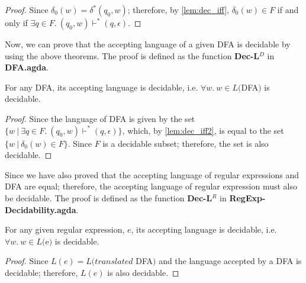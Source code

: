 \begin{proof}
\noindent Since \(\delta_0(w) = \delta^*(q_0,w)\); therefore, by
\autoref{lem:dec_iff}, \(\delta_0(w) \in F\) if and only if \(\exists
q\in F.\ (q_0,w) \vdash^* (q,\epsilon)\). 
\end{proof}

\par Now, we can prove that the accepting language of a given DFA is
decidable by using the above theorems. The proof is
defined as the function \textbf{Dec-L\(^D\)} in \textbf{DFA.agda}. 

\begin{thm}
\noindent For any DFA, its accepting language is decidable,
i.e. \(\forall w.\ w \in L(\)DFA\()\) is decidable. 
\end{thm}

\begin{proof}
\noindent Since the language of DFA is given by the set \(\{w\ |\
\exists q\in F.\ (q_0,w) \vdash^* (q,\epsilon)\}\), which, by
\autoref{lem:dec_iff2}, is equal to the set \(\{w\ |\ \delta_0(w) \in
F\}\). Since \(F\) is a decidable subset; therefore, the set is also
decidable. 
\end{proof}

\par Since we have also proved that the accepting language of regular
expressions and DFA are equal; therefore, the accepting language of
regular expression must also be decidable. The proof is defined as the
function \textbf{Dec-L\(^R\)} in \textbf{RegExp-Decidability.agda}. 

\begin{thm}
\noindent For any given regular expression, \(e\), its accepting language is
decidable, i.e. \(\forall w.\ w \in L(\)e\()\) is decidable. 
\end{thm}

\begin{proof}
\noindent Since \(L(e) = L(translated\) DFA\()\) and the language
accepted by a DFA is decidable; therefore, \(L(e)\) is also decidable. 
\end{proof}